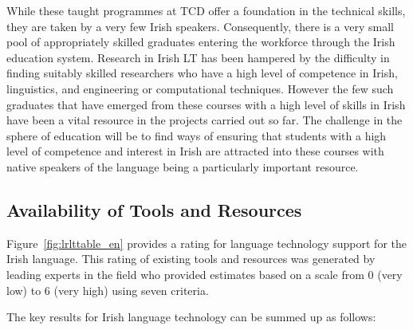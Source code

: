 \begin{multicols}{2}
While these taught programmes at TCD offer a foundation in the technical skills, they are taken by a very few Irish speakers. Consequently, there is a very small pool of appropriately skilled graduates entering the workforce through the Irish education system. Research in Irish LT has been hampered by the difficulty in finding suitably skilled researchers who have a high level of competence in Irish, linguistics, and engineering or computational techniques. However the few such graduates that have emerged from these courses with a high level of skills in Irish have been a vital resource in the projects carried out so far. The challenge in the sphere of education will be to find ways of ensuring that students with a high level of competence and interest in Irish are attracted into these courses with native speakers of the language being a particularly important resource. 



\subsection{Availability of Tools and Resources}

Figure~\ref{fig:lrlttable_en} provides a rating for language technology support for the Irish language. This rating of existing tools and resources was generated by leading experts in the field who provided estimates based on a scale from 0 (very low) to 6 (very high) using seven criteria.

The key results for Irish language technology can be summed up as follows:


\end{multicols}
